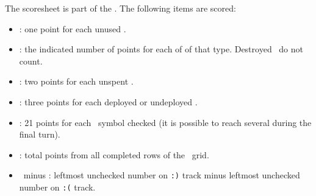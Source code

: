 The scoresheet is part of the \planetsheet.  The following items are scored:
\begin{itemize}
  \item \astronauts: one point for each unused \astronaut.
  \item \armaments: the indicated number of points for each of \armament of that type. Destroyed \armaments\ do not count.
  \item \currency: two points for each unspent \currency.
  \item \squadrons: three points for each deployed or undeployed \squadron.
  \item \mastery: 21 points for each \masterysymbol\ symbol checked (it is possible to reach several during the final turn).
  \item \culture: total points from all completed rows of the \culture\ grid.
  \item \happiness\ minus \unhappiness: leftmost unchecked number on \texttt{:)} track minus leftmost unchecked number on \texttt{:(} track.
\end{itemize}
